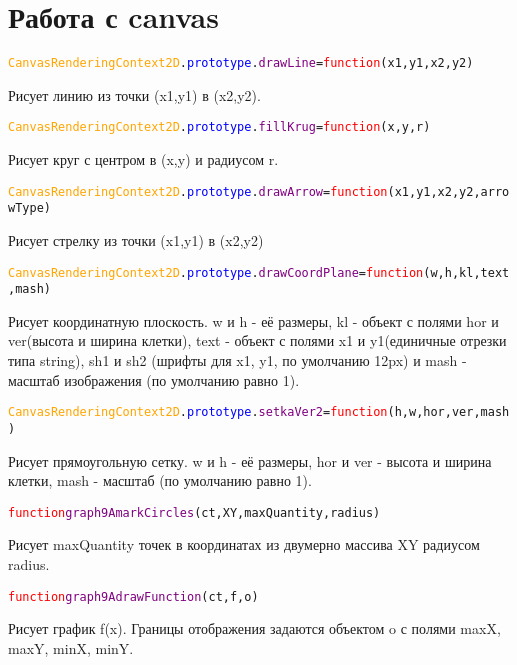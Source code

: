 \documentclass[a4paper,12pt]{article}
\begin{document}
	\section{Работа с canvas}
	\begin{alltt}
		\textcolor{Orange}{CanvasRenderingContext2D}.\textcolor{Blue}{prototype}.\textcolor{Purple}{drawLine}=\textcolor{Red}{function}(x1,y1,x2,y2)
	\end{alltt}
	Рисует линию из точки (x1,y1) в (x2,y2).
	\begin{alltt}
		\textcolor{Orange}{CanvasRenderingContext2D}.\textcolor{Blue}{prototype}.\textcolor{Purple}{fillKrug}=\textcolor{Red}{function}(x,y,r)
	\end{alltt}
	Рисует круг с центром в (x,y) и радиусом r. 
		\begin{alltt}
		\textcolor{Orange}{CanvasRenderingContext2D}.\textcolor{Blue}{prototype}.\textcolor{Purple}{drawArrow}=\textcolor{Red}{function}(x1, y1, x2, y2, arrowType)
	\end{alltt}%
	Рисует стрелку из точки (x1,y1) в (x2,y2)
	\begin{alltt}
		\textcolor{Orange}{CanvasRenderingContext2D}.\textcolor{Blue}{prototype}.\textcolor{Purple}{drawCoordPlane }=\textcolor{Red}{function}(w, h, kl, text, mash)
	\end{alltt}
	Рисует координатную плоскость. w и h  \-- её размеры, kl \-- объект с полями hor и ver(высота и ширина клетки), text \-- объект с полями x1 и y1(единичные отрезки типа string), sh1 и sh2 (шрифты для x1, y1, по умолчанию 12px) и mash - масштаб изображения (по умолчанию равно 1).
	\begin{alltt}
		\textcolor{Orange}{CanvasRenderingContext2D}.\textcolor{Blue}{prototype}.\textcolor{Purple}{setkaVer2  }=\textcolor{Red}{function}(h, w, hor, ver, mash)
	\end{alltt}
	Рисует прямоугольную сетку. w и h  \-- её размеры, hor и ver \-- высота и ширина клетки, mash - масштаб (по умолчанию равно 1).
	\begin{alltt} 
		\textcolor{Red}{function} \textcolor{Purple}{graph9AmarkCircles}(ct, XY, maxQuantity, radius)
	\end{alltt}	
	Рисует maxQuantity точек в координатах из двумерно массива XY радиусом radius.
	\begin{alltt}
		\textcolor{Red}{function} \textcolor{Purple}{graph9AdrawFunction}(ct, f, o)
	\end{alltt}	
	Рисует график f(x). Границы отображения задаются объектом o с полями maxX, maxY, minX, minY.
\end{document}
